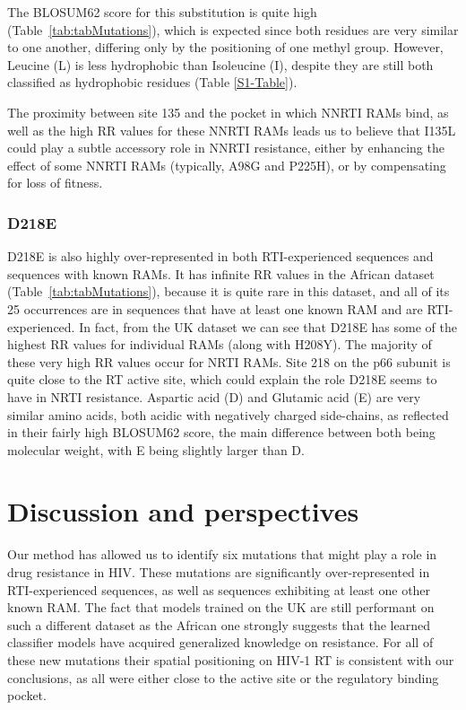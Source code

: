 \documentclass[
  11pt,
  twoside,
  BCOR=10mm,
  listof=totoc]{scrbook}
\begin{document}
The BLOSUM62 score for this substitution is quite high
(Table~\ref{tab:tabMutations}), which is expected since both residues are
very similar to one another, differing only by the positioning of one
methyl group. However, Leucine (L) is less hydrophobic than Isoleucine
(I), despite they are still both classified as hydrophobic residues (Table \ref{S1-Table}).

The proximity between site 135 and the pocket in which NNRTI RAMs bind,
as well as the high RR values for these NNRTI RAMs leads us to believe
that I135L could play a subtle accessory role in NNRTI resistance,
either by enhancing the effect of some NNRTI RAMs (typically, A98G and
P225H), or by compensating for loss of fitness.

\hypertarget{d218e}{%
\subsubsection{D218E}\label{d218e}}

D218E is also highly over-represented in both RTI-experienced sequences
and sequences with known RAMs. It has infinite RR values in the African
dataset (Table~\ref{tab:tabMutations}), because it is quite rare in this dataset,
and all of its 25 occurrences are in sequences that have at least one
known RAM and are RTI-experienced. In fact, from the UK dataset we can
see that D218E has some of the highest RR values for individual RAMs
(along with H208Y). The majority of these very high RR values occur for
NRTI RAMs. Site 218 on the p66 subunit is quite close to the RT active
site, which could explain the role D218E seems to have in NRTI
resistance. Aspartic acid (D) and Glutamic acid (E) are very similar
amino acids, both acidic with negatively charged side-chains, as
reflected in their fairly high BLOSUM62 score, the main difference
between both being molecular weight, with E being slightly larger than
D.

\hypertarget{discussion-and-perspectives}{%
\section{Discussion and perspectives}\label{discussion-and-perspectives}}

Our method has allowed us to identify six mutations that might play a
role in drug resistance in HIV. These mutations are significantly
over-represented in RTI-experienced sequences, as well as sequences
exhibiting at least one other known RAM. The fact that models trained on
the UK are still performant on such a different dataset as the African
one strongly suggests that the learned classifier models have acquired
generalized knowledge on resistance. For all of these new mutations
their spatial positioning on HIV-1 RT is consistent with our
conclusions, as all were either close to the active site or the
regulatory binding pocket.
\end{document}
